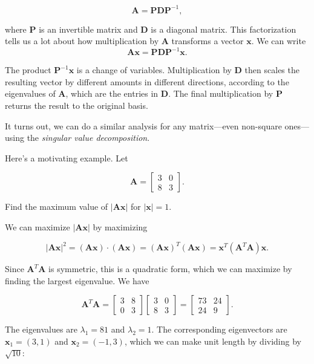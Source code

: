 \documentclass[
]{book}
\theoremstyle{definition}
\theoremstyle{definition}
\theoremstyle{definition}
\theoremstyle{definition}
\theoremstyle{remark}
\begin{document}
\[\mathbf{A}=\mathbf{P}\mathbf{D}\mathbf{P}^{-1},\]

where \(\mathbf{P}\) is an invertible matrix and \(\mathbf{D}\) is a diagonal matrix. This factorization tells us a lot about how multiplication by \(\mathbf{A}\) transforms a vector \(\mathbf{x}.\) We can write
\[\mathbf{A}\mathbf{x}=\mathbf{P}\mathbf{D}\mathbf{P}^{-1}\mathbf{x}.\]

The product \(\mathbf{P}^{-1}\mathbf{x}\) is a change of variables. Multiplication by \(\mathbf{D}\) then scales the resulting vector by different amounts in different directions, according to the eigenvalues of \(\mathbf{A}\), which are the entries in \(\mathbf{D}\). The final multiplication by \(\mathbf{P}\) returns the result to the original basis.

It turns out, we can do a similar analysis for any matrix---even non-square ones---using the \emph{singular value decomposition}.

Here's a motivating example. Let

\[\mathbf{A}=\begin{bmatrix}3 & 0\\8 & 3\end{bmatrix}.\]

Find the maximum value of \(|\mathbf{A}\mathbf{x}|\) for \(|\mathbf{x}|=1\).

We can maximize \(|\mathbf{A}\mathbf{x}|\) by maximizing

\[|\mathbf{A}\mathbf{x}|^2=(\mathbf{A}\mathbf{x})\cdot(\mathbf{A}\mathbf{x})=(\mathbf{A}\mathbf{x})^T(\mathbf{A}\mathbf{x})=\mathbf{x}^T(\mathbf{A}^T\mathbf{A})\mathbf{x}.\]

Since \(\mathbf{A}^T\mathbf{A}\) is symmetric, this is a quadratic form, which we can maximize by finding the largest eigenvalue. We have

\[\mathbf{A}^T\mathbf{A}=\begin{bmatrix}3 & 8\\0 & 3\end{bmatrix}\begin{bmatrix}3 & 0 \\8 & 3\end{bmatrix}=\begin{bmatrix}73 & 24\\24 & 9\end{bmatrix}.\]

The eigenvalues are \(\lambda_1=81\) and \(\lambda_2=1\). The corresponding eigenvectors are \(\mathbf{x}_1=(3,1)\) and \(\mathbf{x}_2=(-1,3)\), which we can make unit length by dividing by \(\sqrt{10}\):
\end{document}
